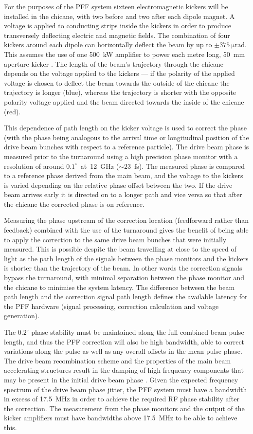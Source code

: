 For the purposes of the PFF system sixteen electromagnetic kickers will be installed in the chicane, with two before and two after each dipole magnet. A voltage is applied to conducting strips inside the kickers in order to produce transversely deflecting electric and magnetic fields. The combination of four kickers around each dipole can horizontally deflect the beam by up to \(\pm375~\mathrm{\mu rad}\). This assumes the use of one 500~kW amplifier to power each metre long, 50~mm aperture kicker \cite{clicCDR}. The length of the beam's trajectory through the chicane depends on the voltage applied to the kickers --- if the polarity of the applied voltage is chosen to deflect the beam towards the outside of the chicane the trajectory is longer (blue), whereas the trajectory is shorter with the opposite polarity voltage applied and the beam directed towards the inside of the chicane (red).

This dependence of path length on the kicker voltage is used to correct the phase (with the phase being analogous to the arrival time or longitudinal position of the drive beam bunches with respect to a reference particle). The drive beam phase is measured prior to the turnaround using a high precision phase monitor with a resolution of around \(0.1^\circ\)~at~12~GHz (\(\sim23\)~fs). The measured phase is compared to a reference phase derived from the main beam, and the voltage to the kickers is varied depending on the relative phase offset between the two. If the drive beam arrives early it is directed on to a longer path and vice versa so that after the chicane the corrected phase is on reference.

Measuring the phase upstream of the correction location (feedforward rather than feedback) combined with the use of the turnaround gives the benefit of being able to apply the correction to the same drive beam bunches that were initially measured. This is possible  despite the beam travelling at close to the speed of light as the path length of the signals between the phase monitors and the kickers is shorter than the trajectory of the beam. In other words the correction signals bypass the turnaround, with minimal separation between the phase monitor and the chicane to minimise the system latency. The difference between the beam path length and the correction signal path length defines the available latency for the PFF hardware (signal processing, correction calculation and voltage generation).

The \(0.2^\circ\) phase stability must be maintained along the full combined beam pulse length, and thus the PFF correction will also be high bandwidth, able to correct variations along the pulse as well as any overall offsets in the mean pulse phase. The drive beam recombination scheme and the properties of the main beam accelerating structures result in the damping of high frequency components 
that may be present in the initial drive beam phase \cite{alexThesis}. 
Given the expected frequency spectrum of the drive beam phase jitter, the PFF system must have a bandwidth in excess of 17.5~MHz in order to achieve the required RF phase stability after the correction. 
The measurement from the phase monitors and the output of the kicker amplifiers must have bandwidths above 17.5~MHz to be able to achieve this.

